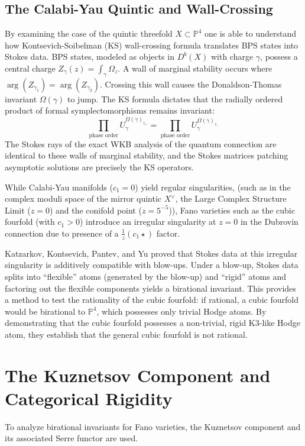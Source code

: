\documentclass[12pt,reqno]{amsart}
\theoremstyle{remark} \newtheorem{remark}[theorem]{Remark}
\begin{document}
\subsection{The Calabi-Yau Quintic and Wall-Crossing}
By examining the
case of the quintic threefold $X \subset \mathbb{P}^4$ one
is able to understand
how Kontsevich-Soibelman (KS) wall-crossing formula translates BPS
states into Stokes data.
BPS states, modeled as objects in $D^b(X)$ with charge $\gamma$,
possess a central charge $Z_\gamma(z) = \int_\gamma \Omega_z$. A wall
of marginal stability occurs where $\arg(Z_{\gamma_1}) =
\arg(Z_{\gamma_2})$. Crossing this wall causes the Donaldson-Thomas
invariant $\Omega(\gamma)$ to jump. The KS formula dictates that the
radially ordered product of formal symplectomorphisms remains
invariant:
\begin{equation}
    \prod_{\text{phase order}} U_\gamma^{\Omega(\gamma)_{z_+}} =
    \prod_{\text{phase order}} U_\gamma^{\Omega(\gamma)_{z_-}}
\end{equation}
The Stokes rays of the exact WKB analysis of the quantum connection
are identical to these walls of marginal stability, and the Stokes
matrices patching asymptotic solutions are precisely the KS operators.

While Calabi-Yau manifolds ($c_1=0$) yield regular singularities,
(such as in the complex moduli space of the mirror
quintic $X^\vee$, the Large Complex
Structure Limit ($z=0$) and the conifold point ($z=5^{-5}$)),
Fano
varieties such as the cubic fourfold (with $c_1 > 0$) introduce an irregular singularity at $z=0$ in
the Dubrovin connection due to presence of a $\frac{1}{z}(c_1 \star)$ factor.

Katzarkov, Kontsevich, Pantev, and Yu proved that Stokes
data at this irregular singularity is additively compatible with
blow-ups. Under a blow-up, Stokes data splits into ``flexible'' atoms
(generated by the blow-up) and ``rigid'' atoms and factoring out the
flexible components yields a birational invariant. This provides a
method to test the rationality of the cubic fourfold: if rational, a
cubic fourfold would be birational to $\mathbb{P}^4$, which possesses
only trivial Hodge atoms. By demonstrating that the cubic fourfold
possesses a non-trivial, rigid K3-like Hodge atom, they establish that the
general cubic fourfold is not rational.

\section{The Kuznetsov Component and Categorical Rigidity}
To analyze birational invariants for Fano varieties,
the Kuznetsov component and its associated Serre functor are used.
\end{document}
